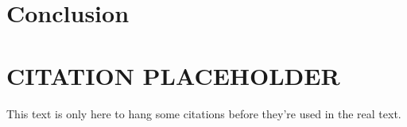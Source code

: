 \documentclass[11pt,conference]{IEEEtran}
\begin{document}


\section{Conclusion}



\section{CITATION PLACEHOLDER}

This text is only here to hang some citations before they're used in the real
text.
\cite{linuxjournal_dht}
\cite{chord}
\cite{parallel}




\end{document}
